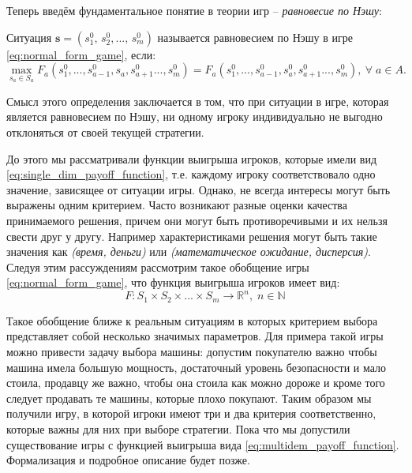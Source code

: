 \begin{flushleft}
Теперь введём фундаментальное понятие в теории игр --
\textit{равновесие по Нэшу}:
\end{flushleft}
\begin{Defenition}
	Ситуация $\textbf{s} = (s_1^0, \, s_2^0, ..., \, s_m^0)$ называется
	\cite{vasin} равновесием по Нэшу в игре \eqref{eq:normal_form_game},
	если:
	\begin{equation}
		\max \limits_{s_a \in S_a} 
		F_a(s_1^0, ..., s_{a-1}^0, s_a, s_{a+1}^0..., s_m^0)=
		F_a(s_1^0, ..., s_{a-1}^0, s_a^0, s_{a+1}^0..., s_m^0),
		\: \forall \; a \in A.
		\label{eq:nash_equilibrium}
	\end{equation}
\end{Defenition}

Смысл этого определения заключается в том, что 
при ситуации в игре, которая является равновесием по Нэшу,
ни одному игроку индивидуально не выгодно отклоняться от своей текущей 
стратегии.

До этого мы рассматривали функции выигрыша 
игроков, которые имели вид
\eqref{eq:single_dim_payoff_function}, т.е. каждому игроку 
соответствовало одно значение, зависящее от ситуации игры.
Однако, не всегда интересы могут быть выражены одним критерием. Часто 
возникают разные оценки качества принимаемого решения, причем они могут 
быть противоречивыми и их нельзя свести друг у другу. Например 
характеристиками решения могут быть такие значения 
как \textit{(время, деньги)} или 
\textit{(математическое ожидание, дисперсия)}. Следуя этим рассуждениям  
рассмотрим такое обобщение игры \eqref{eq:normal_form_game}, что функция
выигрыша игроков имеет вид:
\begin{equation}
	F: S_1 \times S_2 \times ... \times S_m \rightarrow \mathbb R^n
	, \; n \in \mathbb{N}
	\label{eq:multidem_payoff_function}
\end{equation}

Такое обобщение ближе к реальным ситуациям
в которых критерием выбора представляет собой несколько значимых параметров.
Для примера такой игры можно привести задачу выбора машины: 
допустим покупателю важно чтобы машина имела большую мощность, 
достаточный уровень безопасности 
и мало стоила, продавцу же важно, чтобы она стоила как можно дороже и 
кроме того следует продавать те машины, которые плохо покупают. 
Таким образом мы получили игру, в которой игроки имеют три и два критерия
соответственно, которые важны для них при выборе стратегии. 
Пока что мы допустили существование игры с функцией выигрыша
вида \eqref{eq:multidem_payoff_function}. Формализация и подробное 
описание будет позже.


